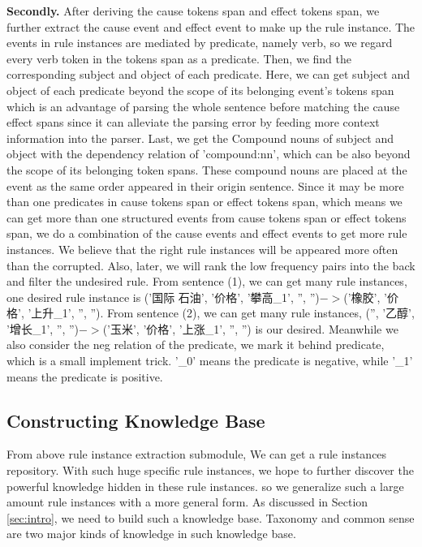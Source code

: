 \textbf{Secondly.} After deriving the cause tokens span and effect tokens span, we further extract the cause event and effect event to make up the rule instance. The events in rule instances are mediated by predicate, namely verb, so we regard every verb token in the tokens span as a predicate. Then, we find the corresponding subject and object of each predicate. Here, we can get subject and object of each predicate beyond the scope of its belonging event's tokens span which is an advantage of parsing the whole sentence before matching the cause effect spans since it can alleviate the parsing error by feeding more context information into the parser. Last, we get the Compound nouns of subject and object with the dependency relation of 'compound:nn', which can be also beyond the scope of its belonging token spans. These compound nouns are placed at the event as the same order appeared in their origin sentence. Since it may be more than one predicates in cause tokens span or effect tokens span, which means we can get more than one structured events from cause tokens span or effect tokens span, we do a combination of the cause events and effect events to get more rule instances. We believe that the right rule instances will be appeared more often than the corrupted. Also, later, we will rank the low frequency pairs into the back and filter the undesired rule. From sentence (1), we can get many rule instances, one desired rule instance is ('国际 石油', '价格', '攀高\_1', '', '')$->$('橡胶', '价格', '上升\_1', '', ''). From sentence (2), we can get many rule instances, ('', '乙醇', '增长\_1', '', '')$->$('玉米', '价格', '上涨\_1', '', '') is our desired. Meanwhile we also consider the neg relation of the predicate, we mark it behind predicate, which is a small implement trick. '\_0' means the predicate is negative, while '\_1' means the predicate is positive.


\subsection{Constructing Knowledge Base}
From above rule instance extraction submodule, We can get a rule instances repository. With such huge specific rule instances, we hope to further discover the powerful knowledge hidden in these rule instances. 
so we generalize such a large amount rule instances with a more general form. As discussed in Section \ref{sec:intro}, we need to build such a knowledge base. Taxonomy and common sense are two major kinds of knowledge in such knowledge base.

